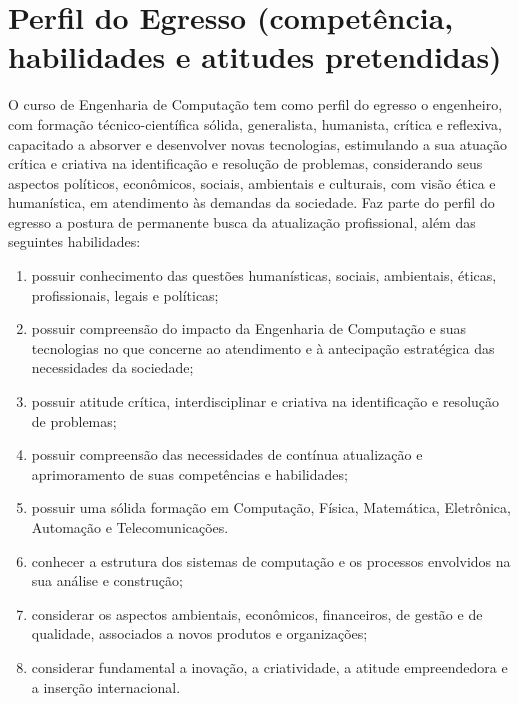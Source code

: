\section{Perfil do Egresso (competência, habilidades e atitudes pretendidas)}
O curso de Engenharia de Computação tem como perfil do egresso o engenheiro, com formação técnico-científica sólida, generalista, humanista, crítica e reflexiva, capacitado a absorver e desenvolver novas tecnologias, estimulando a sua atuação crítica e criativa na identificação e resolução de problemas, considerando seus aspectos políticos, econômicos, sociais, ambientais e culturais, com visão ética e humanística, em atendimento às demandas da sociedade. Faz parte do perfil do egresso a postura de permanente busca da atualização profissional, além das seguintes habilidades:
\begin{enumerate} [I -]
\item possuir conhecimento das questões humanísticas, sociais, ambientais, éticas, profissionais, legais e políticas;
\item possuir compreensão do impacto da Engenharia de Computação e suas tecnologias no que concerne ao atendimento e à antecipação estratégica das necessidades da sociedade;
\item possuir atitude crítica, interdisciplinar e criativa na identificação e resolução de problemas;
\item possuir compreensão das necessidades de contínua atualização e aprimoramento de suas competências e habilidades;
\item possuir uma sólida formação em Computação, Física, Matemática, Eletrônica, Automação e Telecomunicações.
\item conhecer a estrutura dos sistemas de computação e os processos envolvidos na sua análise e construção;
\item considerar os aspectos ambientais, econômicos, financeiros, de gestão e de qualidade, associados a novos produtos e organizações;
\item considerar fundamental a inovação, a criatividade, a atitude empreendedora e a inserção internacional.
\end{enumerate}


